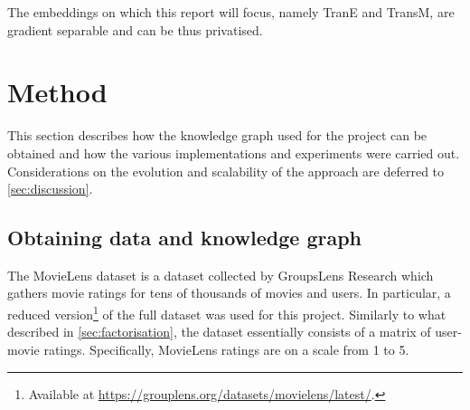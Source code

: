 The embeddings on which this report will focus, namely TranE and TransM, are gradient separable and can be thus privatised.




\section{Method}

This section describes how the knowledge graph used for the project can be obtained and how the various implementations and experiments were carried out.
Considerations on the evolution and scalability of the approach are deferred to \cref{sec:discussion}.

\subsection{Obtaining data and knowledge graph}\label{sec:creation}

The MovieLens dataset is a dataset collected by GroupsLens Research which gathers movie ratings for tens of thousands of movies and users.
In particular, a reduced version\footnote{Available at \href{https://grouplens.org/datasets/movielens/latest/}{https://grouplens.org/datasets/movielens/latest/}.} of the full dataset was used for this project.
Similarly to what described in \cref{sec:factorisation}, the dataset essentially consists of a matrix of user-movie ratings.
Specifically, MovieLens ratings are on a scale from \num{1} to \num{5}.

